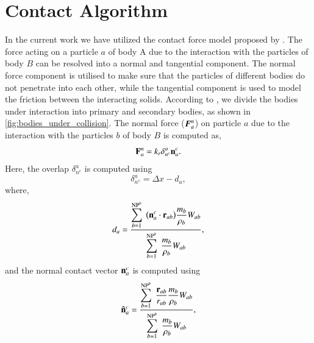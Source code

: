 \section{Contact Algorithm}
\label{sec:contact-algorithm}
In the current work we have utilized the contact force model proposed by
\textcite{mohseni2021particle}. The force acting on a particle $a$ of body A due
to the interaction with the particles of body $B$ can be resolved into a
normal and tangential component. The normal force component is utilised to
make sure that the particles of different bodies do not penetrate into each
other, while the tangential component is used to model the friction between
the interacting solids. According to \textcite{mohseni2021particle}, we divide the
bodies under interaction into primary and secondary bodies, as shown in
\cref{fig:bodies_under_collision}.
The normal force ($\boldsymbol{F}_a^{n}$) on
particle $a$ due to the interaction with the particles $b$ of body $B$ is
computed as,
\begin{equation}
  \label{eq:contact-algorithm-normal}
  \mathbf{F}_a^n = k_r \delta_{n^{c}}^{a} \mathbf{n}_a^{c}.
\end{equation}
Here, the overlap $\delta_{n^{c}}^{a}$ is computed using
\begin{equation}
  \label{eq:csph:cf-overlap}
  \delta_{n^{c}}^{a} = \Delta x - d_a,
\end{equation}
where,
\begin{equation}
  \label{eq:cf-distance-computation}
  d_a = \frac{
    \displaystyle\sum\limits_{b = 1}^{\text{NP}^{b}} \;
    \big( \mathbf{n}_a^{c} \cdot \mathbf{r}_{ab} \big)  \frac{m_b}{\rho_b} W_{ab}}
  {
    \displaystyle\sum\limits_{b = 1}^{\text{NP}^{b}} \;
    \frac{m_b}{\rho_b} W_{ab}},
\end{equation}
and the normal contact vector $\mathbf{n}_a^{c}$ is computed using
\begin{equation}
  \label{eq:cf-normal-vector}
  \mathbf{\hat{n}}_a^{c} = \frac{
    \displaystyle\sum\limits_{b = 1}^{\text{NP}^{b}} \;
    \frac{\mathbf{r}_{ab}}{r_{ab}}  \frac{m_b}{\rho_b} W_{ab}}
  {
    \displaystyle\sum\limits_{b = 1}^{\text{NP}^{b}} \;
    \frac{m_b}{\rho_b} W_{ab}},
\end{equation}
